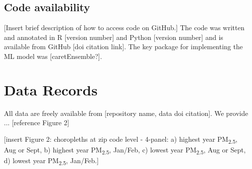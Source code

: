 \documentclass[english]{article}
\begin{document}
\subsection*{Code availability}


[Insert brief description of how to access code on GitHub.] The code was written and annotated in R [version number] and Python [version number] and is available from GitHub [doi citation link]. The key package for implementing the ML model was [caretEnsemble?]. 

\section*{Data Records}



All data are freely available from [repository name, data doi citation]. We provide ... [reference Figure 2]

[insert Figure 2: choropleths at zip code level - 4-panel: a) highest year PM\textsubscript{2.5}, Aug or Sept, b) highest year PM\textsubscript{2.5}, Jan/Feb, c) lowest year PM\textsubscript{2.5}, Aug or Sept, d) lowest year PM\textsubscript{2.5}, Jan/Feb.] %
\end{document}
